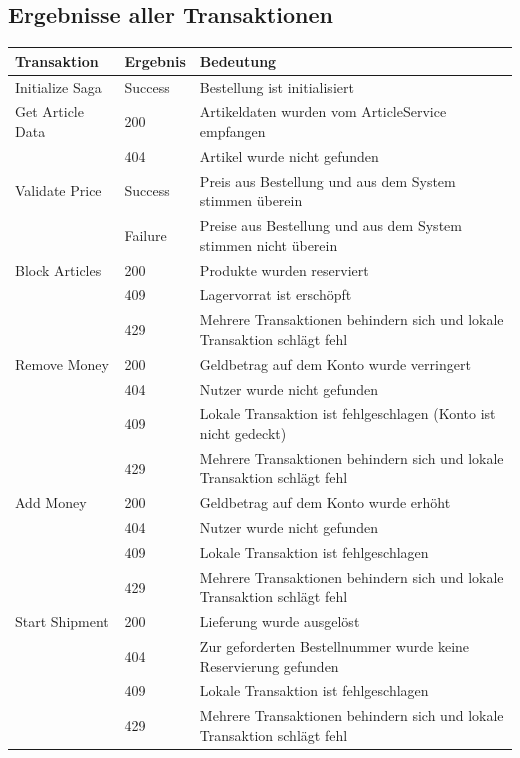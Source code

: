 \subsection{Ergebnisse aller Transaktionen}
\begin{center}
	\begin{tabular}[h]{|p{3cm}|p{1.5cm}|p{11cm}|}
		\hline
		Transaktion	& Ergebnis & Bedeutung \\ \hline
		Initialize Saga 	& Success 	& Bestellung ist initialisiert \\ \hline
		Get Article Data	& 200 		& Artikeldaten wurden vom ArticleService empfangen \\
							& 404 		& Artikel wurde nicht gefunden \\ \hline
		Validate Price 		& Success 	& Preis aus Bestellung und aus dem System stimmen überein \\
							& Failure 	& Preise aus Bestellung und aus dem System stimmen nicht überein \\ \hline
		Block Articles		& 200		& Produkte wurden reserviert \\
							& 409 		& Lagervorrat ist erschöpft \\
							& 429 		& Mehrere Transaktionen behindern sich und lokale Transaktion schlägt fehl \\ \hline
		Remove Money 		& 200		& Geldbetrag auf dem Konto wurde verringert \\
							& 404		& Nutzer wurde nicht gefunden \\
							& 409		& Lokale Transaktion ist fehlgeschlagen (Konto ist nicht gedeckt) \\
							& 429		& Mehrere Transaktionen behindern sich und lokale Transaktion schlägt fehl \\ \hline
		Add Money 			& 200		& Geldbetrag auf dem Konto wurde erhöht \\
							& 404		& Nutzer wurde nicht gefunden \\
							& 409		& Lokale Transaktion ist fehlgeschlagen \\
							& 429		& Mehrere Transaktionen behindern sich und lokale Transaktion schlägt fehl \\ \hline
		Start Shipment 		& 200		& Lieferung wurde ausgelöst \\
							& 404		& Zur geforderten Bestellnummer wurde keine Reservierung gefunden \\
							& 409		& Lokale Transaktion ist fehlgeschlagen \\
							& 429 		& Mehrere Transaktionen behindern sich und lokale Transaktion schlägt fehl \\ \hline

\end{tabular}
\end{center}
